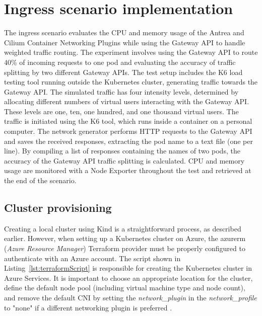 
\section{Ingress scenario implementation}
\label{sec:ingressImpl}

The ingress scenario evaluates the CPU and memory usage of the Antrea and Cilium Container Networking Plugins while using the Gateway API to handle weighted traffic routing. The experiment involves using the Gateway API to route 40\% of incoming requests to one pod and evaluating the accuracy of traffic splitting by two different Gateway APIs. The test setup includes the K6 load testing tool running outside the Kubernetes cluster, generating traffic towards the Gateway API. The simulated traffic has four intensity levels, determined by allocating different numbers of virtual users interacting with the Gateway API. These levels are one, ten, one hundred, and one thousand virtual users. The traffic is initiated using the K6 tool, which runs inside a container on a personal computer. The network generator performs HTTP requests to the Gateway API and saves the received responses, extracting the pod name to a text file (one per line). By compiling a list of responses containing the names of two pods, the accuracy of the Gateway API traffic splitting is calculated. CPU and memory usage are monitored with a Node Exporter throughout the test and retrieved at the end of the scenario.


\subsection{Cluster provisioning}
\label{sec:clusterProvisioning}

Creating a local cluster using Kind is a straightforward process, as described earlier. However, when setting up a Kubernetes cluster on Azure, the azurerm (\textit{Azure Resource Manager}) Terraform provider must be properly configured to authenticate with an Azure account. The script shown in Listing~\ref{lst:terraformScript} is responsible for creating the Kubernetes cluster in Azure Services. It is important to choose an appropriate location for the cluster, define the default node pool (including virtual machine type and node count), and remove the default CNI by setting the \textit{network\_plugin} in the \textit{network\_profile} to "none" if a different networking plugin is preferred \cite{AKS}.

